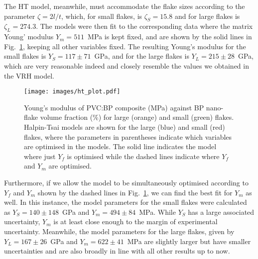 The HT model, meanwhile, 
must accommodate the flake sizes 
according to the parameter $\zeta=2l/t$, 
which, for small flakes, is $\zeta_S=15.8$ 
and for large flakes is $\zeta_L=274.3$.
%
The models were then fit to the corresponding 
data where the matrix Young' modulus $Y_m=511$~MPa is kept fixed, 
and are shown by the solid lines in Fig.~\ref{fig:ht_plot}, 
keeping all other variables fixed.
%
The resulting Young's modulus
for the small flakes is 
$Y_S=117\pm71$~GPa, 
and for the large flakes is 
$Y_L=215\pm28$~GPa, 
which are very reasonable indeed 
and closely resemble the values we 
obtained in the VRH model.

\begin{figure}[th!]
\centering
\texttt{[image: images/ht\_plot.pdf]}
\caption[PVC:BP Young's modulus fit to Halpin-Tsai model]{
Young's modulus of PVC:BP composite (MPa) 
against BP nano-flake volume fraction (\%) 
for large (orange) and small (green) flakes.
%
Halpin-Tsai models are shown for the 
large (blue) and small (red) flakes, 
where the parameters in parentheses indicate 
which variables are optimised in the models.
%
The solid line indicates the model where just $Y_f$ is optimised 
while the dashed lines indicate where $Y_f$ and $Y_m$ are optimised. 
%
}
\label{fig:ht_plot}
\end{figure}

Furthermore, 
if we allow the model 
to be simultaneously optimised according to 
$Y_f$ and $Y_m$ 
shown by the dashed lines in Fig.~\ref{fig:ht_plot}, 
we can find the best fit for $Y_m$ as well.
%
In this instance, 
the model parameters for the small flakes 
were calculated as 
$Y_S=140\pm148$~GPa 
and   
$Y_m=494\pm84$~MPa.
%
While $Y_S$ has a large associated uncertainty, 
$Y_m$ is at least close enough to the margin of 
experimental uncertainty.
%
Meanwhile, 
the model parameters for the large flakes, 
given by  
$Y_L=167\pm26$~GPa 
and 
$Y_m=622\pm41$~MPa
are slightly larger but have smaller uncertainties 
and are also broadly in line 
with all other results up to now.
%

